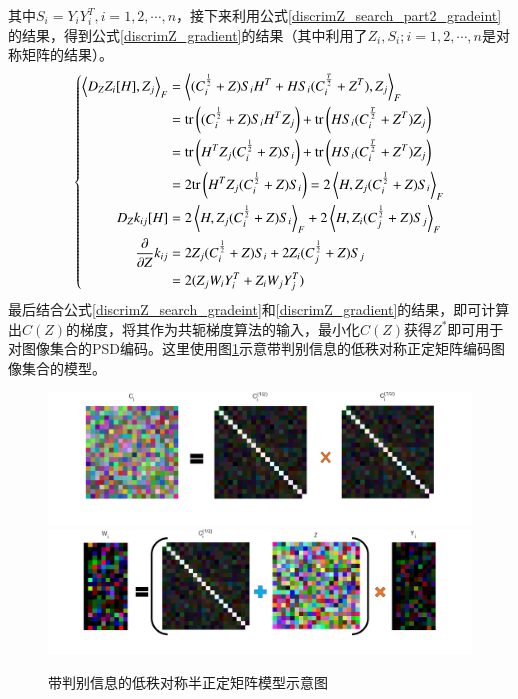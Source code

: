 其中$S_{i}=Y_{i}Y_{i}^{T},i=1,2,\cdots,n$，接下来利用公式\ref{discrimZ_search_part2_gradeint}的结果，得到公式\ref{discrimZ_gradient}的结果（其中利用了$Z_{i},S_{i};i=1,2,\cdots,n$是对称矩阵的结果）。
\begin{equation}
\label{discrimZ_gradient}
\left\{
\begin{split}
\left<D_{Z}Z_i[H],Z_j\right>_{F}&=\left<(C_{i}^{\frac{1}{2}}+Z)S_{i}H^{T}+HS_{i}(C_{i}^{\frac{T}{2}}+Z^{T}),Z_j\right>_{F}\\
&={\rm tr}\left((C_{i}^{\frac{1}{2}}+Z)S_{i}H^{T}Z_j\right)+{\rm tr}\left(HS_{i}(C_{i}^{\frac{T}{2}}+Z^{T})Z_j\right)\\
&={\rm tr}\left(H^{T}Z_j(C_{i}^{\frac{1}{2}}+Z)S_{i}\right)+{\rm tr}\left(HS_{i}(C_{i}^{\frac{T}{2}}+Z^{T})Z_j\right)\\
&=2{\rm tr}\left(H^{T}Z_j(C_{i}^{\frac{1}{2}}+Z)S_{i}\right)=2\left<H,Z_j(C_{i}^{\frac{1}{2}}+Z)S_{i}\right>_{F}\\
D_{Z}k_{ij}[H]&=2\left<H,Z_j(C_{i}^{\frac{1}{2}}+Z)S_{i}\right>_{F}+2\left<H,Z_i(C_{j}^{\frac{1}{2}}+Z)S_{j}\right>_{F}\\
\frac{\partial}{\partial Z}k_{ij}&=2Z_j(C_{i}^{\frac{1}{2}}+Z)S_{i}+2Z_i(C_{j}^{\frac{1}{2}}+Z)S_{j}\\
&=2(Z_{j}W_{i}Y_{i}^{T}+Z_{i}W_{j}Y_{j}^{T})
\end{split}
\right.
\end{equation}
最后结合公式\ref{discrimZ_search_gradeint}和\ref{discrimZ_gradient}的结果，即可计算出$C(Z)$的梯度，将其作为共轭梯度算法的输入，最小化$C(Z)$获得$Z^{*}$即可用于对图像集合的PSD编码。这里使用图\ref{fig:Discrim_LRPSD}示意带判别信息的低秩对称正定矩阵编码图像集合的模型。
\begin{figure}[htb]
	\centering
      	{\includegraphics[width=\linewidth]{source/Discrim_LRPSD_sqrt.png}}
		{\includegraphics[width=\linewidth]{source/Discrim_LRPSD_W.png}}
	\caption{带判别信息的低秩对称半正定矩阵模型示意图}
	\label{fig:Discrim_LRPSD}
\end{figure}
